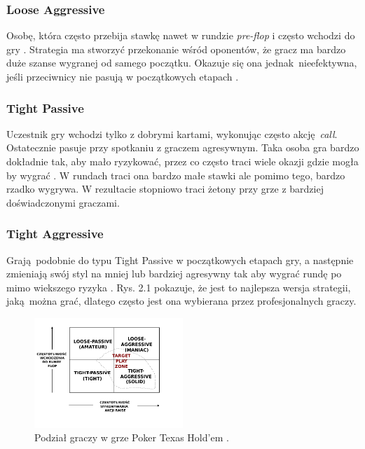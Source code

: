 \documentclass[12pt,oneside,a4paper]{report}
\begin{document}
\subsubsection{Loose Aggressive}

Osobę, która często przebija stawkę nawet w rundzie \emph{pre-flop} i często wchodzi do gry
\cite{class}. Strategia ma stworzyć przekonanie wśród
oponentów, że gracz ma bardzo duże szanse wygranej od samego początku. 
Okazuje się ona jednak nieefektywna, jeśli przeciwnicy nie pasują w początkowych etapach 
\cite{class}. 

\subsubsection{Tight Passive}

Uczestnik gry wchodzi tylko z dobrymi kartami, wykonując często akcję \emph{call}. 
Ostatecznie pasuje przy spotkaniu z graczem agresywnym. Taka osoba gra bardzo dokładnie tak, aby
mało ryzykować, przez co często traci wiele okazji gdzie mogła by wygrać \cite{class}.
W rundach traci ona bardzo małe stawki ale pomimo tego, bardzo rzadko wygrywa. W rezultacie stopniowo traci
żetony przy grze z bardziej doświadczonymi graczami.

\subsubsection{Tight Aggressive}

Grają podobnie do typu Tight Passive w początkowych etapach gry, a następnie zmieniają swój
styl na mniej lub bardziej agresywny tak aby wygrać rundę po mimo wiekszego ryzyka \cite{class}. Rys. 2.1 pokazuje, że jest to najlepsza wersja strategii, jaką można
grać, dlatego często jest ona wybierana przez profesjonalnych graczy.

\vspace{1cm}


\begin{figure}[h!]
            \center
           \includegraphics[width=0.5\textwidth]{./img/class.pdf}
           \caption{Podział graczy w grze Poker Texas Hold'em \cite{class}.}
\end{figure}
\end{document}

